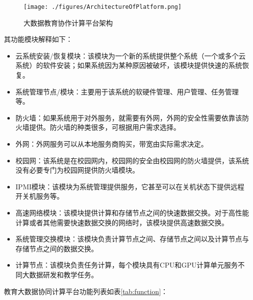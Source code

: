 \documentclass[12pt]{ctexart}%
\begin{document}
\begin{figure}[!htb]
\centering
\texttt{[image: ./figures/ArchitectureOfPlatform.png]}
\caption{大数据教育协作计算平台架构}
\label{fig:architecture}
\end{figure}
其功能模块解释如下：
\begin{itemize}
\item 云系统安装/恢复模块：该模块为一个新的系统提供整个系统（一个或多个云系统）的软件安装；如果系统因为某种原因被破坏，该模块提供快速的系统恢复。
\item 系统管理节点/模块：主要用于该系统的软硬件管理、用户管理、任务管理等。
\item 防火墙：如果系统用于对外服务，就需要有外网，外网的安全性需要依靠该防火墙提供。防火墙的种类很多，可根据用户需求选择。
\item 外网：外网服务可以从本地服务商购买，带宽由实际需求决定。
\item 校园网：该系统是在校园网内，校园网的安全由校园网的防火墙提供，该系统没有必要专门为校园网提供防火墙模块。
\item IPMI模块：该模块为系统管理提供服务，它甚至可以在关机状态下提供远程开关机服务等。
\item 高速网络模块：该模块提供计算和存储节点之间的快速数据交换。对于高性能计算或者其他需要快速数据交换的网络时，该模块提供高速数据交换。
\item 系统管理交换模块：该模块负责计算节点之间、存储节点之间以及计算节点与存储节点之间的数据交换。
\item 计算节点：该模块负责任务计算，每个模块具有CPU和GPU计算单元服务不同大数据研发和教学任务。
\end{itemize}
教育大数据协同计算平台功能列表如表\ref{tab:function}：
\end{document}

